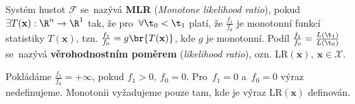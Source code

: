 \begin{define}
	Systém hustot $\mathcal{F}$ se~nazývá  \textbf{MLR} (\textit{Monotone likelihood ratio}), pokud \newline $\exists T(\textbf{x}):\R^n\to\R^1$ tak, že pro~$\forall\t_0<\t_1$ platí, že $\frac{f_1}{f_0}$ je monotonní funkcí statistiky $T(\textbf{x})$, tzn. \mbox{$\frac{f_1}{f_0}=g\br{T(\textbf{x})}$}, kde $g$ je monotonní. Podíl $\frac{f_1}{f_0}=\frac{L(\t_1)}{L(\t_0)}$ se~nazývá \textbf{věrohodnostním poměrem} (\textit{likelihood ratio}), ozn. $\mathrm{LR}(\textbf{x}),~\textbf{x}\in\mathcal{X}$.
\end{define}
\begin{remark}
	Pokládáme $\frac{f_1}{f_0}=+\infty$, pokud $f_1>0,~f_0=0$. Pro~$f_1=0$ a~$f_0=0$ výraz nedefinujeme. Monotonii vyžadujeme pouze tam, kde je výraz $\mathrm{LR}(\textbf{x})$ definován.
\end{remark}
